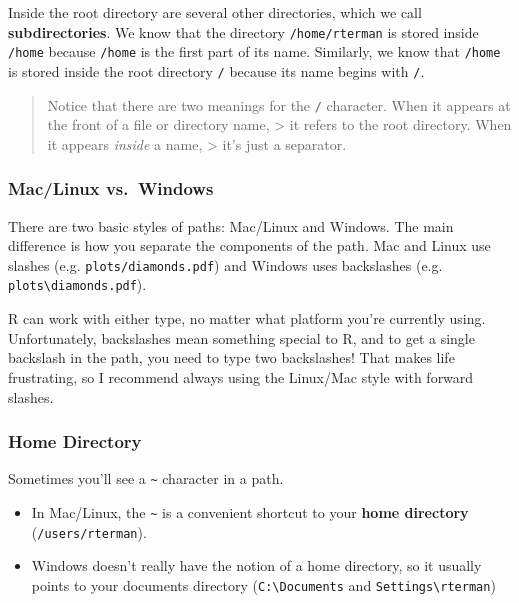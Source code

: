 \documentclass[]{book}
\providecommand{\tightlist}{%
  \setlength{\itemsep}{0pt}\setlength{\parskip}{0pt}}
\begin{document}
Inside the root directory are several other directories, which we call
\textbf{subdirectories}. We know that the directory
\texttt{/home/rterman} is stored inside \texttt{/home} because
\texttt{/home} is the first part of its name. Similarly, we know that
\texttt{/home} is stored inside the root directory \texttt{/} because
its name begins with \texttt{/}.

\begin{quote}
Notice that there are two meanings for the \texttt{/} character. When it
appears at the front of a file or directory name, \textgreater{} it
refers to the root directory. When it appears \emph{inside} a name,
\textgreater{} it's just a separator.
\end{quote}

\subsubsection*{Mac/Linux vs.~Windows}\label{maclinux-vs.windows}

There are two basic styles of paths: Mac/Linux and Windows. The main
difference is how you separate the components of the path. Mac and Linux
use slashes (e.g. \texttt{plots/diamonds.pdf}) and Windows uses
backslashes (e.g. \texttt{plots\textbackslash{}diamonds.pdf}).

R can work with either type, no matter what platform you're currently
using. Unfortunately, backslashes mean something special to R, and to
get a single backslash in the path, you need to type two backslashes!
That makes life frustrating, so I recommend always using the Linux/Mac
style with forward slashes.

\subsubsection*{Home Directory}\label{home-directory}

Sometimes you'll see a \texttt{\textasciitilde{}} character in a path.

\begin{itemize}
\tightlist
\item
  In Mac/Linux, the \texttt{\textasciitilde{}} is a convenient shortcut
  to your \textbf{home directory} (\texttt{/users/rterman}).
\item
  Windows doesn't really have the notion of a home directory, so it
  usually points to your documents directory
  (\texttt{C:\textbackslash{}Documents} and
  \texttt{Settings\textbackslash{}rterman})
\end{itemize}
\end{document}
